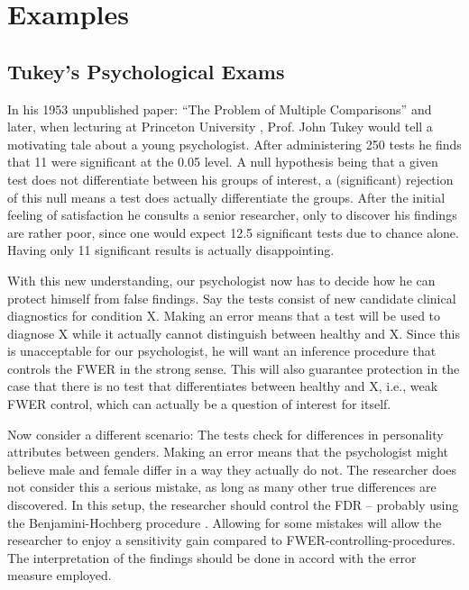 \documentclass[review,12pt]{article}
\theoremstyle{definition}
\theoremstyle{definition}
\begin{document}
\section{\label{sec:examples}Examples}




\subsection{\label{sec:tukey_exams}Tukey's Psychological Exams}
In his 1953 unpublished paper: ``The Problem of Multiple Comparisons'' \citep{benjamini_john_2002} and later, when lecturing at Princeton University \citep{donoho_higher_2004}, Prof. John Tukey would tell a motivating tale about a young psychologist. After administering 250 tests he finds that 11 were significant at the 0.05 level. A null hypothesis being that a given test does not differentiate between his groups of interest, a (significant) rejection of this null means a test does actually differentiate the groups.
After the initial feeling of satisfaction he consults a senior researcher, only to discover his findings are rather poor, since one  would expect 12.5 significant tests due to chance alone. Having only 11 significant results is actually disappointing.


With this new understanding, our psychologist now has to decide how he can protect himself from false findings. 
Say the tests consist of new candidate clinical diagnostics for condition X. Making an error means that a test will be used to diagnose X while it actually cannot distinguish between healthy and X. Since this is unacceptable for our psychologist, he will want an inference procedure that controls the FWER in the strong sense. This will also guarantee protection  in the case that there is no test that differentiates between healthy and X, i.e., weak FWER control, which can actually be a question of interest for itself.


Now consider a different scenario: The tests check for differences in personality attributes between genders. Making an error means that the psychologist might believe male and female differ in a way they actually do not. The researcher does not consider this a serious mistake, as long as many other true differences are discovered. In this setup, the researcher should control the FDR -- probably using the Benjamini-Hochberg procedure \citep{benjamini_controlling_1995}. Allowing for some mistakes will allow the researcher to enjoy a sensitivity gain compared to FWER-controlling-procedures. The interpretation of the findings should be done in accord with the error measure employed.
\end{document}
